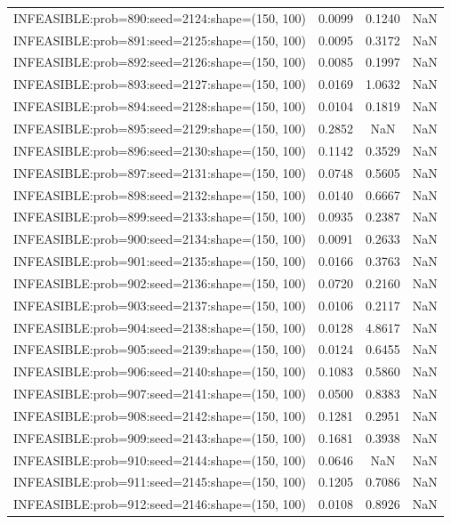 \begin{longtable}{lccc}
INFEASIBLE:prob=890:seed=2124:shape=(150, 100) & 0.0099 &  0.1240 &    NaN \\
INFEASIBLE:prob=891:seed=2125:shape=(150, 100) & 0.0095 &  0.3172 &    NaN \\
INFEASIBLE:prob=892:seed=2126:shape=(150, 100) & 0.0085 &  0.1997 &    NaN \\
INFEASIBLE:prob=893:seed=2127:shape=(150, 100) & 0.0169 &  1.0632 &    NaN \\
INFEASIBLE:prob=894:seed=2128:shape=(150, 100) & 0.0104 &  0.1819 &    NaN \\
INFEASIBLE:prob=895:seed=2129:shape=(150, 100) & 0.2852 &     NaN &    NaN \\
INFEASIBLE:prob=896:seed=2130:shape=(150, 100) & 0.1142 &  0.3529 &    NaN \\
INFEASIBLE:prob=897:seed=2131:shape=(150, 100) & 0.0748 &  0.5605 &    NaN \\
INFEASIBLE:prob=898:seed=2132:shape=(150, 100) & 0.0140 &  0.6667 &    NaN \\
INFEASIBLE:prob=899:seed=2133:shape=(150, 100) & 0.0935 &  0.2387 &    NaN \\
INFEASIBLE:prob=900:seed=2134:shape=(150, 100) & 0.0091 &  0.2633 &    NaN \\
INFEASIBLE:prob=901:seed=2135:shape=(150, 100) & 0.0166 &  0.3763 &    NaN \\
INFEASIBLE:prob=902:seed=2136:shape=(150, 100) & 0.0720 &  0.2160 &    NaN \\
INFEASIBLE:prob=903:seed=2137:shape=(150, 100) & 0.0106 &  0.2117 &    NaN \\
INFEASIBLE:prob=904:seed=2138:shape=(150, 100) & 0.0128 &  4.8617 &    NaN \\
INFEASIBLE:prob=905:seed=2139:shape=(150, 100) & 0.0124 &  0.6455 &    NaN \\
INFEASIBLE:prob=906:seed=2140:shape=(150, 100) & 0.1083 &  0.5860 &    NaN \\
INFEASIBLE:prob=907:seed=2141:shape=(150, 100) & 0.0500 &  0.8383 &    NaN \\
INFEASIBLE:prob=908:seed=2142:shape=(150, 100) & 0.1281 &  0.2951 &    NaN \\
INFEASIBLE:prob=909:seed=2143:shape=(150, 100) & 0.1681 &  0.3938 &    NaN \\
INFEASIBLE:prob=910:seed=2144:shape=(150, 100) & 0.0646 &     NaN &    NaN \\
INFEASIBLE:prob=911:seed=2145:shape=(150, 100) & 0.1205 &  0.7086 &    NaN \\
INFEASIBLE:prob=912:seed=2146:shape=(150, 100) & 0.0108 &  0.8926 &    NaN \\

\end{longtable}
